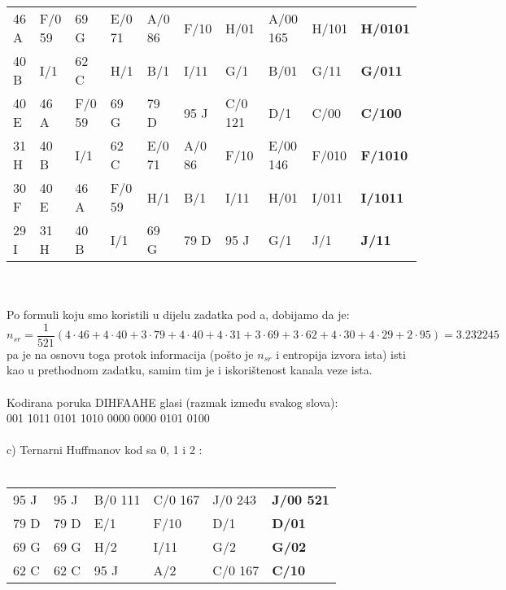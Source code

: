 \documentclass[12pt]{article}
\begin{document}
\begin{enumerate}
\begin{tabular}{|l|l|l|l|l|l|l|l|l|l|}
46 A & F/0 59 & 69 G   & E/0 71 & A/0 86  & F/10     & H/01     & A/00 165 & H/101 & \textbf{H/0101} \\ \cline{1-1} \cline{3-3}
40 B & I/1    & 62 C   & H/1    & B/1     & I/11     & G/1      & B/01     & G/11  & \textbf{G/011}  \\ \cline{1-7} \cline{9-9}
40 E & 46 A   & F/0 59 & 69 G   & 79 D    & 95 J     & C/0 121  & D/1      & C/00  & \textbf{C/100}  \\ \cline{1-2} \cline{4-6} \cline{8-8}
31 H & 40 B   & I/1    & 62 C   & E/0 71  & A/0 86   & F/10     & E/00 146 & F/010 & \textbf{F/1010} \\ \cline{1-4}
30 F & 40 E   & 46 A   & F/0 59 & H/1     & B/1      & I/11     & H/01     & I/011 & \textbf{I/1011} \\ \cline{1-3} \cline{5-7}
29 I & 31 H   & 40 B   & I/1    & 69 G    & 79 D     & 95 J     & G/1      & J/1   & \textbf{J/11}   \\ \hline
\end{tabular}
\\
\\ Po formuli koju smo koristili u dijelu zadatka pod a, dobijamo da je:
\begin{equation*}
    n_{sr} = \frac{1}{521}(4 \cdot 46 + 4 \cdot 40 + 3 \cdot 79 + 4 \cdot 40 + 4 \cdot 31 +
    3 \cdot 69 + 3 \cdot 62 + 4 \cdot 30 + 4 \cdot 29 + 2 \cdot 95) = 3.232245
\end{equation*}
pa je na osnovu toga protok informacija (pošto je $n_{sr}$ i entropija izvora ista) isti kao u prethodnom zadatku, samim tim je i iskorištenost kanala veze ista. \\
\\
Kodirana poruka DIHFAAHE glasi (razmak između svakog slova): \\
001 1011 0101 1010 0000 0000 0101 0100 \\
\\
c) Ternarni Huffmanov kod sa 0, 1 i 2 : \\
\\
\begin{tabular}{|l|l|l|l|l|l|}
\hline
95 J & 95 J   & B/0 111 & C/0 167 & J/0 243 & \textbf{J/00 521} \\ \cline{1-2}
79 D & 79 D   & E/1     & F/10    & D/1     & \textbf{D/01}     \\ \cline{1-2}
69 G & 69 G   & H/2     & I/11    & G/2     & \textbf{G/02}     \\ \cline{1-3} \cline{5-5}
62 C & 62 C   & 95 J    & A/2     & C/0 167 & \textbf{C/10}     \\ \cline{1-4}

\end{tabular}
\end{enumerate}
\end{document}
